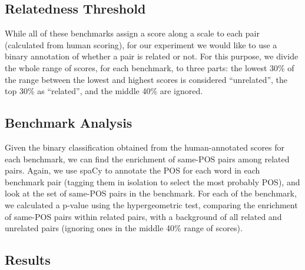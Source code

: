 \documentclass[11pt,a4paper]{article}
\begin{document}
{    \subsection{Relatedness Threshold}\label{sec:threshold}
    
    While all of these benchmarks assign a score along a scale to each pair
    (calculated from human scoring), for our experiment we would like to use
    a binary annotation of whether a pair is related or not.
    For this purpose, we divide the whole range of scores,
    for each benchmark, to three parts:
    the lowest 30\% of the range between the lowest and highest scores
    is considered ``unrelated'', the top 30\% as ``related'',
    and the middle 40\% are ignored.
    
    \subsection{Benchmark Analysis}\label{benchmark_analysis}
    
    Given the binary classification obtained from the human-annotated scores
    for each benchmark, we can find the enrichment of same-POS pairs among
    related pairs.
    Again, we use spaCy to annotate the POS for each word in each benchmark
    pair (tagging them in isolation to select the most probably POS),
    and look at the set of same-POS pairs in the benchmark.
    For each of the benchmark, we calculated a p-value using the hypergeometric
    test, comparing the enrichment of same-POS pairs within related pairs,
    with a background of all related and unrelated pairs (ignoring ones in
    the middle 40\% range of scores).
    
    \subsection{Results}\label{sec:benchmark_results}
    
}
\end{document}
